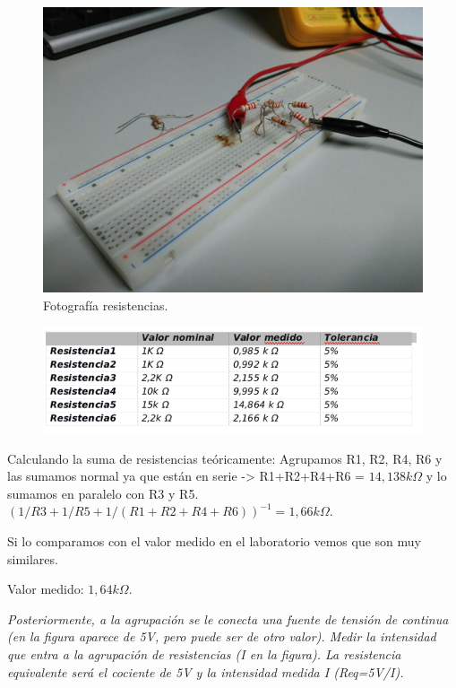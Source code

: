 \documentclass[paper=a4, fontsize=11pt]{scrartcl} %
\numberwithin{equation}{section} %
\numberwithin{figure}{section} %
\numberwithin{table}{section} %
\begin{document}
\begin{figure}[H]
	\centering
	\includegraphics[scale=0.3]{image/practica1-resistencias}
	\caption{Fotografía resistencias.} \label{Color-resistencia}
\end{figure}

\begin{figure}[H]
	\centering
	\includegraphics[width=\linewidth]{image/tablavictor}
	\label{fig:tablavictor}
\end{figure}


Calculando la suma de resistencias teóricamente: \newline
Agrupamos R1, R2, R4, R6 y las     sumamos normal ya que están en serie -> R1+R2+R4+R6 = $ 14,138 k \Omega $  y lo sumamos en paralelo con R3 y R5.  $(1/R3+1/R5+1/(R1+R2+R4+R6))^{-1} =  1,66 k \Omega $. \newline

Si lo comparamos con el valor medido en el laboratorio vemos que son muy similares. \newline

Valor medido: $ 1,64 k \Omega $. \newline

\textit{Posteriormente, a la agrupación se le conecta una fuente de tensión de continua (en la figura aparece de 5V, pero puede ser de otro valor). Medir la intensidad que entra a la agrupación de resistencias (I en la figura). La resistencia equivalente será el cociente de 5V y la intensidad medida I (Req=5V/I).} \newline
\end{document}
